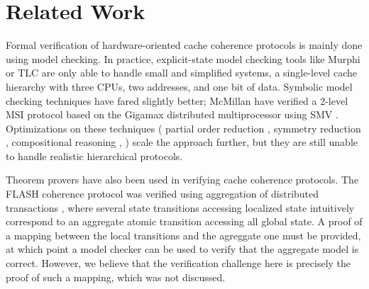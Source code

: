 \section{Related Work}
\label{relatedWork}

Formal verification of hardware-oriented cache coherence protocols is mainly
done using model checking. In practice, explicit-state model checking tools like
Murphi \cite{murphi} or TLC \cite{tlc} are only able to handle small and
simplified systems, \eg{} a single-level cache hierarchy with three CPUs, two
addresses, and one bit of data. Symbolic model checking techniques have fared
slightly better; McMillan \etal{} have verified a 2-level MSI protocol based on
the Gigamax distributed multiprocessor using SMV \cite{gigamax}.  Optimizations on these techniques
(\eg{} partial order reduction \cite{part}, symmetry reduction \cite{sym1,
  sym2}, compositional reasoning \cite{comp}, \etc{}) scale the approach
further, but they are still unable to handle realistic hierarchical protocols.

Theorem provers have also been used in verifying cache coherence protocols. The
FLASH coherence protocol was verified using aggregation of
distributed  transactions \cite{park},
where several state transitions accessing localized state intuitively
correspond to an aggregate atomic transition accessing all global state. A
proof of a mapping between the local transitions and the agreggate one must be
provided, at which point a model checker can be used to verify that the
aggregate model is correct. However, we believe that the verification challenge
here is precisely the proof of such a mapping, which was not discussed.




